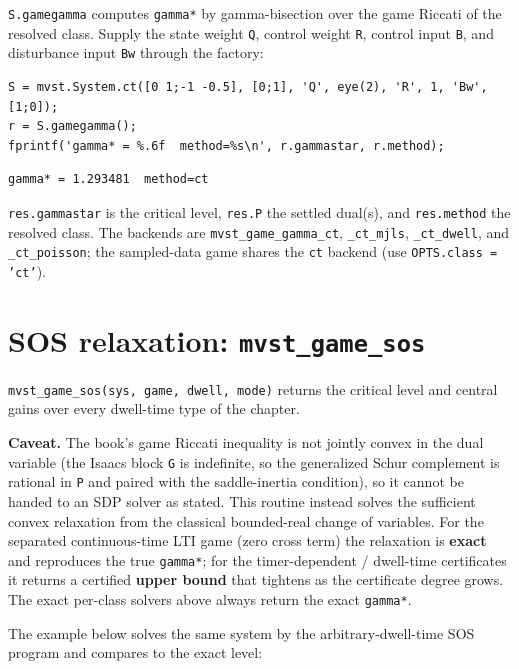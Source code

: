 \documentclass[11pt,oneside]{report}
\newcommand{\code}[1]{\texttt{#1}}
\begin{document}
\code{S.gamegamma} computes \code{gamma*} by gamma-bisection over the game Riccati of the
resolved class. Supply the state weight \code{Q}, control weight \code{R}, control input
\code{B}, and disturbance input \code{Bw} through the factory:

\begin{lstlisting}[style=matlabstyle]
S = mvst.System.ct([0 1;-1 -0.5], [0;1], 'Q', eye(2), 'R', 1, 'Bw', [1;0]);
r = S.gamegamma();
fprintf('gamma* = %.6f  method=%s\n', r.gammastar, r.method);
\end{lstlisting}

\begin{lstlisting}[style=outputstyle]
gamma* = 1.293481  method=ct
\end{lstlisting}

\code{res.gammastar} is the critical level, \code{res.P} the settled dual(s), and
\code{res.method} the resolved class. The backends are \code{mvst\_game\_gamma\_ct},
\code{\_ct\_mjls}, \code{\_ct\_dwell}, and \code{\_ct\_poisson}; the sampled-data game shares the
\code{ct} backend (use \code{OPTS.class = 'ct'}).

\hypertarget{sos-relaxation-mvst_game_sos}{%
\section{\texorpdfstring{SOS relaxation: \code{mvst\_game\_sos}}{SOS relaxation: mvst\_game\_sos}}\label{sos-relaxation-mvst_game_sos}}

\code{mvst\_game\_sos(sys, game, dwell, mode)} returns the critical level and central
gains over every dwell-time type of the chapter.

\textbf{Caveat.} The book's game Riccati inequality is not jointly convex in
the dual variable (the Isaacs block \code{G} is indefinite, so the generalized Schur
complement is rational in \code{P} and paired with the saddle-inertia condition), so
it cannot be handed to an SDP solver as stated. This routine instead solves the
sufficient convex relaxation from the classical bounded-real change of
variables. For the separated continuous-time LTI game (zero cross term) the
relaxation is \textbf{exact} and reproduces the true \code{gamma*}; for the
timer-dependent / dwell-time certificates it returns a certified \textbf{upper bound}
that tightens as the certificate degree grows. The exact per-class solvers above
always return the exact \code{gamma*}.

The example below solves the same system by the arbitrary-dwell-time SOS program and
compares to the exact level:
\end{document}
